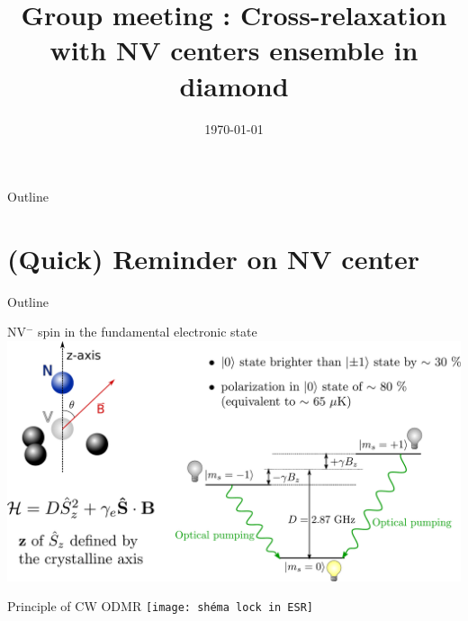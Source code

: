 \documentclass{beamer}
\title{Group meeting : Cross-relaxation with NV centers ensemble in diamond}
\date\today
\begin{document}
\begin{frame}
\maketitle
\end{frame}
\begin{frame}{Outline}
\tableofcontents
\end{frame}
\section{(Quick) Reminder on NV center}
\begin{frame}{Outline}
\tableofcontents[currentsection]
\end{frame}
\begin{frame}{NV$^-$ spin in the fundamental electronic state}
\centering
\includegraphics[width=\textwidth,height=\textheight,keepaspectratio]{slide_3_niveaux}
\end{frame}
\begin{frame}{Principle of CW ODMR}
\centering
\texttt{[image: shéma lock in ESR]}
\end{frame}
\end{document}
